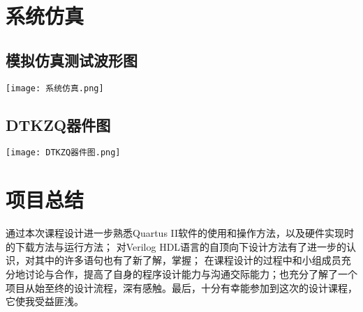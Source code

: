 \documentclass[UTF8]{article}
\begin{document}



\section{系统仿真}
\subsection{模拟仿真测试波形图}
\begin{center}
    \texttt{[image: 系统仿真.png]}
\end{center}

\subsection{DTKZQ器件图}
\begin{center}
    \texttt{[image: DTKZQ器件图.png]}
\end{center}

\section{项目总结}
通过本次课程设计进一步熟悉Quartus II软件的使用和操作方法，以及硬件实现时的下载方法与运行方法；
对Verilog HDL语言的自顶向下设计方法有了进一步的认识，对其中的许多语句也有了新了解，掌握；
在课程设计的过程中和小组成员充分地讨论与合作，提高了自身的程序设计能力与沟通交际能力；也充分了解了一个
项目从始至终的设计流程，深有感触。最后，十分有幸能参加到这次的设计课程，它使我受益匪浅。
\end{document}
